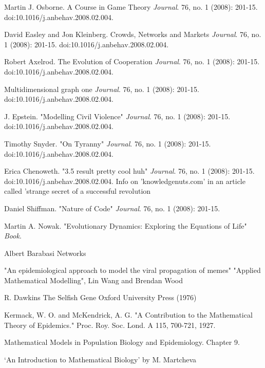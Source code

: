 \begin{thebibliography}{9}
	Martin J. Osborne. A Course in Game Theory
	\textit{Journal}. 
	76, no. 1 (2008): 201-15. doi:10.1016/j.anbehav.2008.02.004.
	
	David Easley and Jon Kleinberg. Crowds, Networks and Markets
	\textit{Journal}. 
	76, no. 1 (2008): 201-15. doi:10.1016/j.anbehav.2008.02.004.
	
	Robert Axelrod. The Evolution of Cooperation
	\textit{Journal}. 
	76, no. 1 (2008): 201-15. doi:10.1016/j.anbehav.2008.02.004.
	
	Multidimensional graph one
	\textit{Journal}. 
	76, no. 1 (2008): 201-15. doi:10.1016/j.anbehav.2008.02.004. 
	
	J. Epstein. "Modelling Civil Violence"
	\textit{Journal}. 
	76, no. 1 (2008): 201-15. doi:10.1016/j.anbehav.2008.02.004. 
	
	Timothy Snyder. "On Tyranny"
	\textit{Journal}. 
	76, no. 1 (2008): 201-15. doi:10.1016/j.anbehav.2008.02.004. 
	
	Erica Chenoweth. "3.5 result pretty cool huh"
	\textit{Journal}. 
	76, no. 1 (2008): 201-15. doi:10.1016/j.anbehav.2008.02.004. Info on 'knowledgenuts.com' in an article called 'strange secret of a successful revolution
	
	Daniel Shiffman. "Nature of Code"
	\textit{Journal}. 
	76, no. 1 (2008): 201-15.
	
	Martin A. Nowak. "Evolutionary Dynamics: Exploring the Equations of Life"
	\textit{Book}. 
	
	Albert Barabasi Networks
	
	"An epidemiological approach to model the viral propagation of memes" "Applied Mathematical Modelling",  Lin Wang and Brendan Wood
	
	R. Dawkins
	The Selfish Gene
	Oxford University Press (1976)
	
	Kermack, W. O. and McKendrick, A. G. "A Contribution to the Mathematical Theory of Epidemics." Proc. Roy. Soc. Lond. A 115, 700-721, 1927. 
	
	Mathematical Models in Population Biology and Epidemiology. Chapter 9.
	
	`An Introduction to Mathematical Biology' by M. Martcheva
	

\end{thebibliography}
